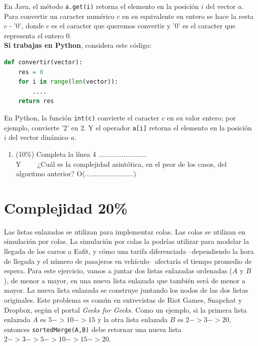 \documentclass[10 pt]{article}
\begin{document}
\begin{multicols}{2}
En Java, el método \texttt{a.get(i)} retorna el elemento en la posición $i$ del vector $a$. Para
convertir un caracter numérico $c$ en su equivalente en entero se hace la resta $c$ - '0', donde $c$ es el caracter
que queremos convertir y '0' es el caracter que representa el entero 0.\\ 

\textbf{Si trabajas en Python}, considera este código:
{\footnotesize
\begin{lstlisting}[language=Python]
def convertir(vector): 
    res = 0
    for i in range(len(vector)): 
        .... 
    return res 
\end{lstlisting}
}

En Python, la función \texttt{int(c)} convierte el caracter $c$ en su valor entero; por ejemplo, convierte '2' en 2.
Y el operador \texttt{a[i]} retorna el elemento en la posición $i$ del vector dinámico $a$.

\begin{enumerate}[label=\Alph*]
  \item (10\%) Completa la línea 4
   .........................\\
  Y \ \ \ \  ¿Cuál es la complejidad asintótica, en el peor de los casos, del algoritmo anterior?
  O(.........................)
\end{enumerate}

\section{Complejidad 20\%}
Las listas enlazadas se utilizan para implementar colas. Las colas se utilizan en simulación por colas. La simulación por colas la podrías utilizar para modelar la llegada
de los carros a Eafit, y cómo una tarifa diferenciada --dependiendo la hora de llegada y el número de pasajeros en vehículo-- afectaría el tiempo promedio de espera. Para este
ejercicio, vamos a juntar dos listas enlazadas ordenadas ($A$ y $B$), de menor a mayor, en una nueva lista enlazada que también será de menor a mayor. La nueva lista enlazada se construye juntando los nodos de las dos listas originales. Este problema es común en entrevistas de Riot Games, Snapchat y Dropbox, según el portal \textit{Geeks for Geeks.} Como un ejemplo, si la primera lista enlazada $A$ es $5->10->15$ y la otra lista enlazada $B$ es $2->3->20$, entonces \texttt{sortedMerge(A,B)} debe retornar una nueva lista $2->3->5->10->15->20$.\\ 


\end{multicols}
\end{document}
